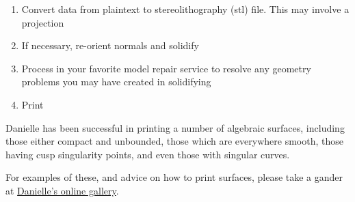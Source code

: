\begin{enumerate}
\item Convert data from plaintext to stereolithography (\gls{stl}) file.  This may involve a projection
\item If necessary, re-orient normals and solidify
\item Process in your favorite model repair service to resolve any geometry problems you may have created in solidifying
\item Print
\end{enumerate}

Danielle has been successful in printing a number of algebraic surfaces, including those either compact and unbounded, those which are everywhere
smooth, those having cusp singularity points, and even those with singular
curves.

For examples of these, and advice on how to print surfaces, please take a gander at \href{http://www.danibrake.org/gallery/}{Danielle's online gallery}.
